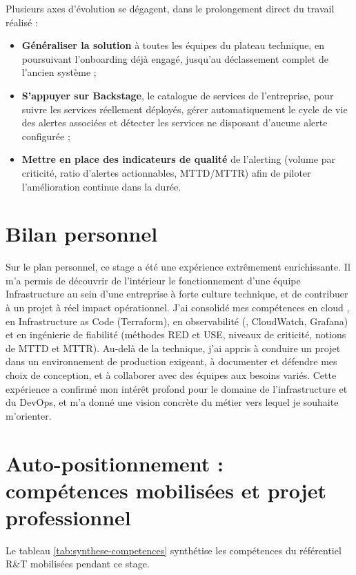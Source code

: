 Plusieurs axes d'évolution se dégagent, dans le prolongement direct du travail réalisé :

\begin{itemize}
	\item \textbf{Généraliser la solution} à toutes les équipes du plateau technique, en poursuivant l'onboarding déjà engagé, jusqu'au déclassement complet de l'ancien système ;
	\item \textbf{S'appuyer sur Backstage}, le catalogue de services de l'entreprise, pour suivre les services réellement déployés, gérer automatiquement le cycle de vie des alertes associées et détecter les services ne disposant d'aucune alerte configurée ;
	\item \textbf{Mettre en place des indicateurs de qualité} de l'alerting (volume par criticité, ratio d'alertes actionnables, MTTD/MTTR) afin de piloter l'amélioration continue dans la durée.
\end{itemize}

\section{Bilan personnel}

Sur le plan personnel, ce stage a été une expérience extrêmement enrichissante. Il m'a permis de
découvrir de l'intérieur le fonctionnement d'une équipe Infrastructure au sein d'une entreprise à forte
culture technique, et de contribuer à un projet à réel impact opérationnel. J'ai consolidé mes
compétences en cloud , en Infrastructure as Code (Terraform), en observabilité (,
CloudWatch, Grafana) et en ingénierie de fiabilité (méthodes RED et USE, niveaux de criticité, notions
de MTTD et MTTR). Au-delà de la technique, j'ai appris à conduire un projet dans un environnement de
production exigeant, à documenter et défendre mes choix de conception, et à collaborer avec des
équipes aux besoins variés. Cette expérience a confirmé mon intérêt profond pour le domaine de
l'infrastructure et du DevOps, et m'a donné une vision concrète du métier vers lequel je souhaite
m'orienter.

\section{Auto-positionnement : compétences mobilisées et projet professionnel}

Le tableau \ref{tab:synthese-competences} synthétise les compétences du référentiel R\&T mobilisées
pendant ce stage.

